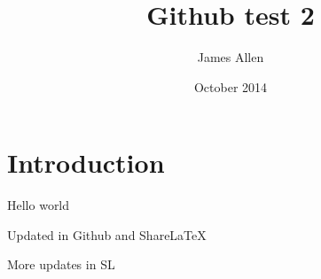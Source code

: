 \documentclass{article}
\title{Github test 2}
\author{James Allen}
\date{October 2014}
\begin{document}
\maketitle

\section{Introduction}

Hello world

Updated in Github and ShareLaTeX

More updates in SL
\end{document}
